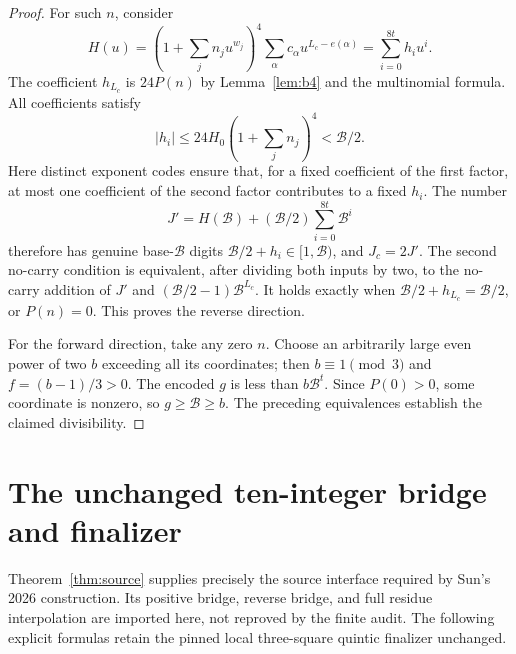 \documentclass[11pt]{article}
\begin{document}
\begin{proof}
For such $n$, consider
\[
 H(u)=\left(1+\sum_jn_ju^{w_j}\right)^4
       \sum_\alpha c_\alpha u^{L_c-e(\alpha)}
       =\sum_{i=0}^{8t}h_i u^i.
\]
The coefficient $h_{L_c}$ is $24P(n)$ by
Lemma~\ref{lem:b4} and the multinomial formula. All coefficients satisfy
\[
 |h_i|\le24H_0(1+\textstyle\sum_jn_j)^4<\mathcal B/2.
\]
Here distinct exponent codes ensure that, for a fixed coefficient of the
first factor, at most one coefficient of the second factor contributes to
a fixed $h_i$. The number
\[
 J'=H(\mathcal B)+(\mathcal B/2)\sum_{i=0}^{8t}\mathcal B^i
\]
therefore has genuine base-$\mathcal B$ digits
$\mathcal B/2+h_i\in[1,\mathcal B)$, and $J_c=2J'$.
The second no-carry condition is equivalent, after dividing both inputs
by two, to the no-carry addition of $J'$ and
$(\mathcal B/2-1)\mathcal B^{L_c}$. It holds exactly when
$\mathcal B/2+h_{L_c}=\mathcal B/2$, or $P(n)=0$.
This proves the reverse direction.

For the forward direction, take any zero $n$. Choose an arbitrarily large
even power of two $b$ exceeding all its coordinates; then $b\equiv1\pmod3$
and $f=(b-1)/3>0$. The encoded $g$ is less than $b\mathcal B^t$.
Since $P(0)>0$, some coordinate is nonzero, so $g\ge\mathcal B\ge b$.
The preceding equivalences establish the claimed divisibility.
\end{proof}

\section{The unchanged ten-integer bridge and finalizer}
Theorem~\ref{thm:source} supplies precisely the source interface required
by Sun's 2026 construction. Its positive bridge, reverse bridge, and full
residue interpolation are imported here, not reproved by the finite audit.
The following explicit formulas retain the pinned local three-square
quintic finalizer unchanged.
\end{document}
